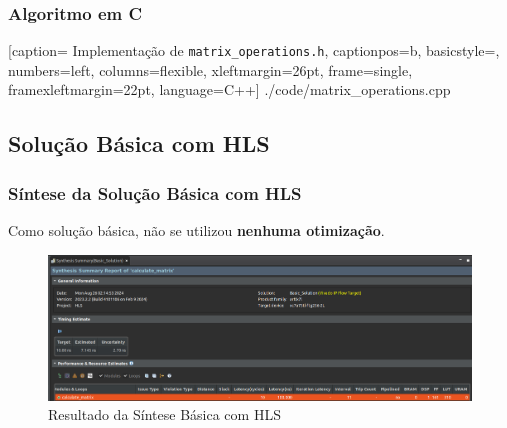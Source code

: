 \documentclass{beamer}
\begin{document}
    \begin{frame}[fragile]
        \frametitle{Algoritmo em C}

        
        [caption= Implementação de \texttt{matrix\_operations.h},
        captionpos=b, 
        basicstyle=\tiny,
        numbers=left,
        columns=flexible,
        xleftmargin=26pt,
        frame=single,
        framexleftmargin=22pt,
        language=C++]
        {./code/matrix_operations.cpp}
    \end{frame}

    \subsection{Solução Básica com HLS}
    \begin{frame}
        \frametitle{Síntese da Solução Básica com HLS}

        \begingroup {}
        Como solução básica,
        não se utilizou \textbf{nenhuma otimização}.
        \endgroup

        \begin{figure}[h] 
            \centering
            \includegraphics[width=1\linewidth]{./images/solutions/HLS_-_Basic_Solution.png}
            \caption{\label{img:syn-hls-basic-solution} Resultado da Síntese Básica com HLS}
          \end{figure}
    \end{frame}
\end{document}
